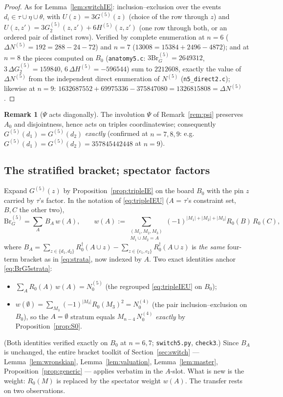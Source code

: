 \documentclass[11pt]{article}
\theoremstyle{definition}
\newtheorem{remark}[theorem]{Remark}
\begin{document}
\begin{proof}
As for Lemma~\ref{lem:switchIE}: inclusion--exclusion over the events
$d_i\in\tau\cup\eta\cup\theta$, with $U(z)=3G^{(5)}(z)$ (choice of the
row through $z$) and $U(z,z')=3G_2^{(5)}(z,z')+6H^{(5)}(z,z')$ (one row
through both, or an ordered pair of distinct rows).  Verified by
complete enumeration at $n=6$
($\Delta N^{(5)}=192=288-24-72$) and $n=7$
($13008=15384+2496-4872$); and at $n=8$ the pieces computed on $B_0$
(\texttt{anatomy5.c}: $3\mathrm{Br}^{(5)}_G=2649312$,
$3\,\Delta G_2^{(5)}=159840$, $6\,\Delta H^{(5)}=-596544$) sum to
$2212608$, exactly the value of $\Delta N^{(5)}$ from the independent
direct enumeration of $N^{(5)}$ (\texttt{n5\_direct2.c}); likewise at
$n=9$: $1632687552+69975336-375847080=1326815808=\Delta N^{(5)}$.
\end{proof}

\begin{remark}[$\Psi$ acts diagonally]
The involution $\Psi$ of Remark~\ref{rem:psi} preserves $A_0$ and
disjointness, hence acts on triples coordinatewise; consequently
$G^{(5)}(d_1)=G^{(5)}(d_2)$ \emph{exactly} (confirmed at $n=7,8,9$:
e.g.\ $G^{(5)}(d_1)=G^{(5)}(d_2)=357845442448$ at $n=9$).
\end{remark}

\subsection{The stratified bracket; spectator factors}

Expand $G^{(5)}(z)$ by Proposition~\ref{prop:tripleIE} on the board
$B_0$ with the pin $z$ carried by $\tau$'s factor.  In the notation of
\eqref{eq:tripleIEU} ($A$ = $\tau$'s constraint set, $B,C$ the other
two),
\begin{equation}\label{eq:BrG5strata}
\mathrm{Br}^{(5)}_G=\sum_{A}\,B_A\,w(A),
\qquad
w(A):=\!\!\sum_{\substack{(M_1,M_2,M_3)\\ M_1\cup M_2=A}}\!\!
(-1)^{|M_1|+|M_2|+|M_3|}R_0(B)\,R_0(C),
\end{equation}
where $B_A=\sum_{z\in\{d_1,d_2\}}R_0^\dagger(A\cup z)
-\sum_{z\in\{e_1,e_2\}}R_0^\dagger(A\cup z)$ is \emph{the same}
four-term bracket as in \eqref{eq:strata}, now indexed by $A$.  Two
exact identities anchor \eqref{eq:BrG5strata}:
\begin{itemize}[leftmargin=2em]
\item[(i)] $\sum_A R_0(A)\,w(A)=N^{(5)}_0$ (the regrouped
\eqref{eq:tripleIEU} on $B_0$);
\item[(ii)] $w(\emptyset)=\sum_{M_3}(-1)^{|M_3|}R_0(M_3)^2=N^{(4)}_0$
(the pair inclusion--exclusion on $B_0$), so the $A=\emptyset$ stratum
equals $M_{n-4}\,N^{(4)}_0$ \emph{exactly} by
Proposition~\ref{prop:S0}.
\end{itemize}
(Both identities verified exactly on $B_0$ at $n=6,7$;
\texttt{switch5.py}, \texttt{check3}.)
Since $B_A$ is unchanged, the entire bracket toolkit of
Section~\ref{sec:switch} --- Lemma~\ref{lem:wronskian},
Lemma~\ref{lem:valuation}, Lemma~\ref{lem:master},
Proposition~\ref{prop:generic} --- applies verbatim in the $A$-slot.
What is new is the weight: $R_0(M)$ is replaced by the spectator weight
$w(A)$.  The transfer rests on two observations.
\end{document}
